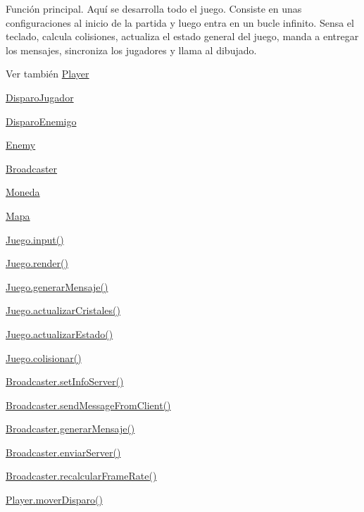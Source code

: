 Función principal. Aquí se desarrolla todo el juego. Consiste en unas configuraciones al inicio de la partida y luego entra en un bucle infinito. Sensa el teclado, calcula colisiones, actualiza el estado general del juego, manda a entregar los mensajes, sincroniza los jugadores y llama al dibujado. \begin{DoxySeeAlso}{Ver también}
\hyperlink{classBatallaEspacial_1_1Player}{Player} 

\hyperlink{classBatallaEspacial_1_1DisparoJugador}{DisparoJugador} 

\hyperlink{classBatallaEspacial_1_1DisparoEnemigo}{DisparoEnemigo} 

\hyperlink{classBatallaEspacial_1_1Enemy}{Enemy} 

\hyperlink{classBatallaEspacial_1_1Broadcaster}{Broadcaster} 

\hyperlink{classBatallaEspacial_1_1Moneda}{Moneda} 

\hyperlink{classBatallaEspacial_1_1Mapa}{Mapa} 

\hyperlink{classBatallaEspacial_1_1Juego_a89aba17b3540c558097299146f1c8c2c}{Juego.input()} 

\hyperlink{classBatallaEspacial_1_1Juego_a1117da461713e965c2fab1b899900f33}{Juego.render()} 

\hyperlink{classBatallaEspacial_1_1Juego_a3117a54416ecf1eb6a58095bf208b656}{Juego.generarMensaje()} 

\hyperlink{classBatallaEspacial_1_1Juego_a4b603f4c903e3dedda9e82893dec9c4b}{Juego.actualizarCristales()} 

\hyperlink{classBatallaEspacial_1_1Juego_a8c738255f12bb1667d8e7ed3cb85f8f3}{Juego.actualizarEstado()} 

\hyperlink{classBatallaEspacial_1_1Juego_ab62b36bb44271e26e869868219344263}{Juego.colisionar()} 

\hyperlink{classBatallaEspacial_1_1Broadcaster_ad2be8560b5f31d97ef2344a79655e809}{Broadcaster.setInfoServer()} 

\hyperlink{classBatallaEspacial_1_1Broadcaster_a7c062941953e1d1f750fa9e405943d17}{Broadcaster.sendMessageFromClient()} 

\hyperlink{classBatallaEspacial_1_1Broadcaster_a5202f4cdca2e7031311dcdc47d7dce73}{Broadcaster.generarMensaje()} 

\hyperlink{classBatallaEspacial_1_1Broadcaster_ad7b5b5b6a2b074967b04406d9d2e4c97}{Broadcaster.enviarServer()} 

\hyperlink{classBatallaEspacial_1_1Broadcaster_a5fbe1fc5364790302e75955fb6021e62}{Broadcaster.recalcularFrameRate()} 

\hyperlink{classBatallaEspacial_1_1Player_ab19130e949cc7025184c788d7ee144cb}{Player.moverDisparo()} 
\end{DoxySeeAlso}
